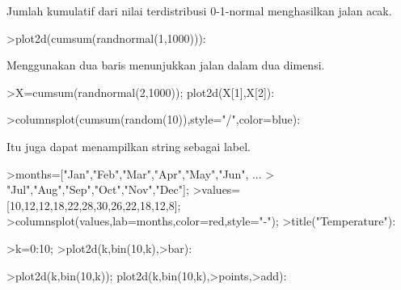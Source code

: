\documentclass{article}
\begin{document}
\begin{eulernotebook}
\begin{eulercomment}
\begin{eulercomment}
\begin{eulercomment}
\begin{eulercomment}
\begin{eulercomment}
\begin{eulercomment}
\begin{eulercomment}
\begin{eulercomment}
\begin{eulercomment}
\begin{eulercomment}
\begin{eulercomment}
\begin{eulercomment}
\begin{eulercomment}
\begin{eulercomment}
\begin{eulercomment}
\begin{eulercomment}
\begin{eulercomment}
\begin{eulercomment}
\begin{eulercomment}
\begin{eulercomment}
\begin{eulercomment}
\begin{eulercomment}
\begin{eulercomment}
\begin{eulercomment}
\begin{eulercomment}
\begin{eulercomment}
\begin{eulercomment}
Jumlah kumulatif dari nilai terdistribusi 0-1-normal menghasilkan
jalan acak.
\end{eulercomment}
\begin{eulerprompt}
>plot2d(cumsum(randnormal(1,1000))):
\end{eulerprompt}
\begin{eulercomment}
Menggunakan dua baris menunjukkan jalan dalam dua dimensi.
\end{eulercomment}
\begin{eulerprompt}
>X=cumsum(randnormal(2,1000)); plot2d(X[1],X[2]):
\end{eulerprompt}
\begin{eulerprompt}
>columnsplot(cumsum(random(10)),style="/",color=blue):
\end{eulerprompt}
\begin{eulercomment}
Itu juga dapat menampilkan string sebagai label.
\end{eulercomment}
\begin{eulerprompt}
>months=["Jan","Feb","Mar","Apr","May","Jun", ...
>  "Jul","Aug","Sep","Oct","Nov","Dec"];
>values=[10,12,12,18,22,28,30,26,22,18,12,8];
>columnsplot(values,lab=months,color=red,style="-");
>title("Temperature"):
\end{eulerprompt}
\begin{eulerprompt}
>k=0:10;
>plot2d(k,bin(10,k),>bar):
\end{eulerprompt}
\begin{eulerprompt}
>plot2d(k,bin(10,k)); plot2d(k,bin(10,k),>points,>add):
\end{eulerprompt}
\begin{eulerprompt}

\end{eulerprompt}
\end{eulercomment}
\end{eulercomment}
\end{eulercomment}
\end{eulercomment}
\end{eulercomment}
\end{eulercomment}
\end{eulercomment}
\end{eulercomment}
\end{eulercomment}
\end{eulercomment}
\end{eulercomment}
\end{eulercomment}
\end{eulercomment}
\end{eulercomment}
\end{eulercomment}
\end{eulercomment}
\end{eulercomment}
\end{eulercomment}
\end{eulercomment}
\end{eulercomment}
\end{eulercomment}
\end{eulercomment}
\end{eulercomment}
\end{eulercomment}
\end{eulercomment}
\end{eulercomment}
\end{eulernotebook}
\end{document}
